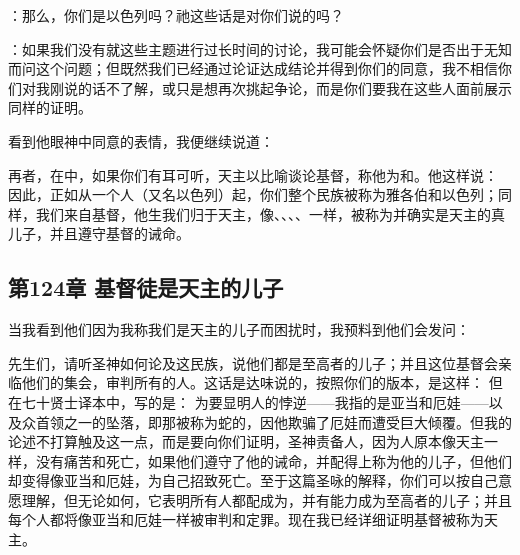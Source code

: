 ：那么，你们是以色列吗？祂这些话是对你们说的吗？\par

：如果我们没有就这些主题进行过长时间的讨论，我可能会怀疑你们是否出于无知而问这个问题；但既然我们已经通过论证达成结论并得到你们的同意，我不相信你们对我刚说的话不了解，或只是想再次挑起争论，而是你们要我在这些人面前展示同样的证明。\par

看到他眼神中同意的表情，我便继续说道：\par

 再者，在中，如果你们有耳可听，天主以比喻谈论基督，称他为和。他这样说： 因此，正如从一个人（又名以色列）起，你们整个民族被称为雅各伯和以色列；同样，我们来自基督，他生我们归于天主，像、、、、一样，被称为并确实是天主的真儿子，并且遵守基督的诫命。\par


\subsection{第124章 基督徒是天主的儿子}

当我看到他们因为我称我们是天主的儿子而困扰时，我预料到他们会发问：\par

 先生们，请听圣神如何论及这民族，说他们都是至高者的儿子；并且这位基督会亲临他们的集会，审判所有的人。这话是达味说的，按照你们的版本，是这样： 但在七十贤士译本中，写的是： 为要显明人的悖逆——我指的是亚当和厄娃——以及众首领之一的坠落，即那被称为蛇的，因他欺骗了厄娃而遭受巨大倾覆。但我的论述不打算触及这一点，而是要向你们证明，圣神责备人，因为人原本像天主一样，没有痛苦和死亡，如果他们遵守了他的诫命，并配得上称为他的儿子，但他们却变得像亚当和厄娃，为自己招致死亡。至于这篇圣咏的解释，你们可以按自己意愿理解，但无论如何，它表明所有人都配成为，并有能力成为至高者的儿子；并且每个人都将像亚当和厄娃一样被审判和定罪。现在我已经详细证明基督被称为天主。\par

